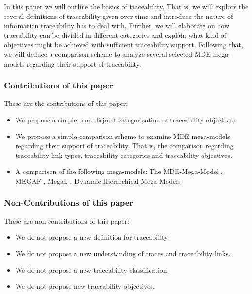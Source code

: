 \documentclass[runningheads,a4paper]{llncs}
\begin{document}
In this paper we will outline the basics of traceability.
That is, we will explore the several definitions of traceability given over time and introduce the nature of information traceability has to deal with.
Further, we will elaborate on how traceability can be divided in different categories and explain what kind of objectives might be achieved with sufficient traceability support.
Following that, we will deduce a comparison scheme to analyze several selected MDE mega-models regarding their support of traceability.

\subsubsection{Contributions of this paper}
These are the contributions of this paper:
\begin{itemize}

\item
We propose a simple, non-disjoint categorization of traceability objectives.

\item
We propose a simple comparison scheme to examine MDE mega-models regarding their support of traceability.
That is, the comparison regarding traceability link types, traceability categories and traceability objectives.

\item
A comparison of the following mega-models: 
 The MDE-Mega-Model \cite{TowardsAMegamodel},
 MEGAF \cite{MEGAF},
 MegaL \cite{MEGAL2},
 Dynamic Hierarchical Mega-Models \cite{DHMM}

\end{itemize}

\subsubsection{Non-Contributions of this paper}
These are non contributions of this paper:
\begin{itemize}

\item
We do not propose a new definition for traceability.

\item
We do not propose a new understanding of traces and traceability links.

\item
We do not propose a new traceability classification.

\item
We do not propose new traceability objectives.

\end{itemize}
\end{document}
